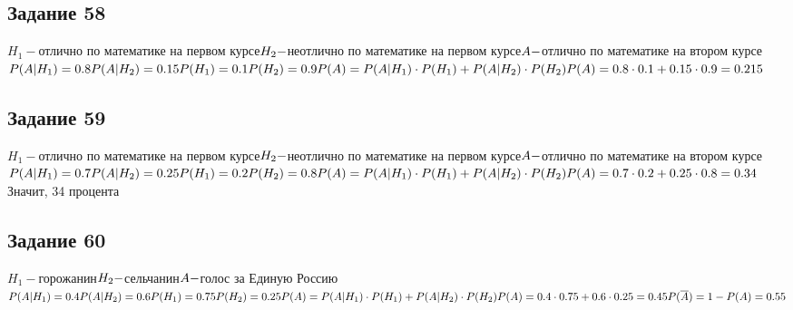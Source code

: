 \documentclass[12pt]{article}
\begin{document}
\newpage
\subsection{Задание 58}
$
H_1-$отлично по математике на первом курсе$\\
H_2-$неотлично по математике на первом курсе$\\
A-$отлично по математике на втором курсе$\\
P(A|H_1)=0.8\\
P(A|H_2)=0.15\\
P(H_1)=0.1\\
P(H_2)=0.9\\
P(A)=P(A|H_1)\cdot P(H_1)+P(A|H_2)\cdot P(H_2)\\
P(A)=0.8 \cdot 0.1 + 0.15 \cdot 0.9 = 0.215
$

\newpage
\subsection{Задание 59}
$
H_1-$отлично по математике на первом курсе$\\
H_2-$неотлично по математике на первом курсе$\\
A-$отлично по математике на втором курсе$\\
P(A|H_1)=0.7\\
P(A|H_2)=0.25\\
P(H_1)=0.2\\
P(H_2)=0.8\\
P(A)=P(A|H_1)\cdot P(H_1)+P(A|H_2)\cdot P(H_2)\\
P(A)=0.7 \cdot 0.2 + 0.25 \cdot 0.8 = 0.34\\
$
Значит, 34 процента

\newpage
\subsection{Задание 60}
$
H_1-$горожанин$\\
H_2-$сельчанин$\\
A-$голос за Единую Россию$\\
P(A|H_1)=0.4\\
P(A|H_2)=0.6\\
P(H_1)=0.75\\
P(H_2)=0.25\\
P(A)=P(A|H_1)\cdot P(H_1)+P(A|H_2)\cdot P(H_2)\\
P(A)=0.4 \cdot 0.75 + 0.6 \cdot 0.25 = 0.45\\
P(\overline A)=1-P(A) = 0.55
$

\newpage
\end{document}
